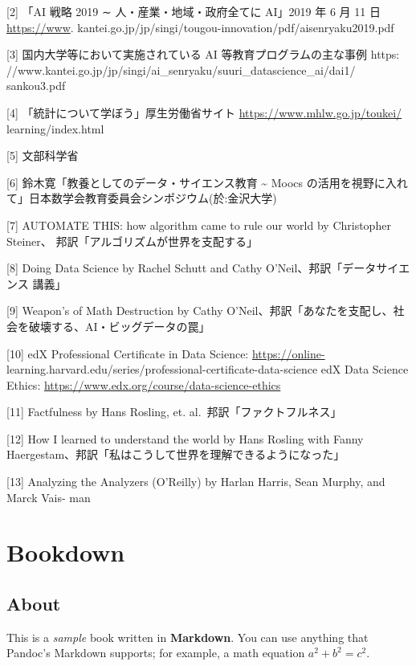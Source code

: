 \documentclass[
]{book}
\theoremstyle{definition}
\theoremstyle{definition}
\theoremstyle{definition}
\theoremstyle{definition}
\theoremstyle{remark}
\begin{document}
{[}2{]} 「AI 戦略 2019 ∼ 人・産業・地域・政府全てに AI」2019 年 6 月 11 日 \url{https://www}. kantei.go.jp/jp/singi/tougou-innovation/pdf/aisenryaku2019.pdf

{[}3{]} 国内大学等において実施されている AI 等教育プログラムの主な事例 https: //www.kantei.go.jp/jp/singi/ai\_senryaku/suuri\_datascience\_ai/dai1/ sankou3.pdf

{[}4{]} 「統計について学ぼう」厚生労働省サイト \url{https://www.mhlw.go.jp/toukei/} learning/index.html

{[}5{]} 文部科学省

{[}6{]} 鈴木寛「教養としてのデータ・サイエンス教育 \textasciitilde{} Moocs の活用を視野に入れて」日本数学会教育委員会シンポジウム(於:金沢大学)

{[}7{]} AUTOMATE THIS: how algorithm came to rule our world by Christopher Steiner、 邦訳「アルゴリズムが世界を支配する」

{[}8{]} Doing Data Science by Rachel Schutt and Cathy O'Neil、邦訳「データサイエンス 講義」

{[}9{]} Weapon's of Math Destruction by Cathy O'Neil、邦訳「あなたを支配し、社会を破壊する、AI・ビッグデータの罠」

{[}10{]} edX Professional Certificate in Data Science: \url{https://online-} learning.harvard.edu/series/professional-certificate-data-science edX Data Science Ethics: \url{https://www.edx.org/course/data-science-ethics}

{[}11{]} Factfulness by Hans Rosling, et. al.~邦訳「ファクトフルネス」

{[}12{]} How I learned to understand the world by Hans Rosling with Fanny Haergestam、邦訳「私はこうして世界を理解できるようになった」

{[}13{]} Analyzing the Analyzers (O'Reilly) by Harlan Harris, Sean Murphy, and Marck Vais- man

\hypertarget{bookdown}{%
\chapter{Bookdown}\label{bookdown}}

\hypertarget{about}{%
\section{About}\label{about}}

This is a \emph{sample} book written in \textbf{Markdown}. You can use anything that Pandoc's Markdown supports; for example, a math equation \(a^2 + b^2 = c^2\).
\end{document}
